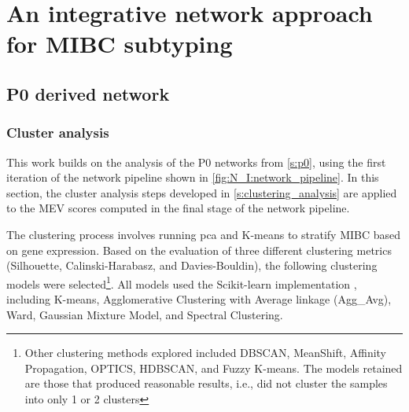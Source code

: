\chapter{An integrative network approach for MIBC subtyping}


\section{P0 derived network} \label{s:ap:P0}

\subsection{Cluster analysis} \label{s:ap:P0_cs_analysis}


This work builds on the analysis of the P0 networks from \cref{s:p0}, using the first iteration of the network pipeline shown in \cref{fig:N_I:network_pipeline}. In this section, the cluster analysis steps developed in \cref{s:clustering_analysis} are applied to the MEV scores computed in the final stage of the network pipeline.

The clustering process involves running \acrfull{pca} and K-means to stratify MIBC based on gene expression. Based on the evaluation of three different clustering metrics (Silhouette, Calinski-Harabasz, and Davies-Bouldin), the following clustering models were selected\footnote{Other clustering methods explored included DBSCAN, MeanShift, Affinity Propagation, OPTICS, HDBSCAN, and Fuzzy K-means. The models retained are those that produced reasonable results, i.e., did not cluster the samples into only 1 or 2 clusters}. All models used the Scikit-learn implementation \cite{Scikit-learn_undated-ax}, including K-means, Agglomerative Clustering with Average linkage (Agg\_Avg), Ward, Gaussian Mixture Model, and Spectral Clustering.

